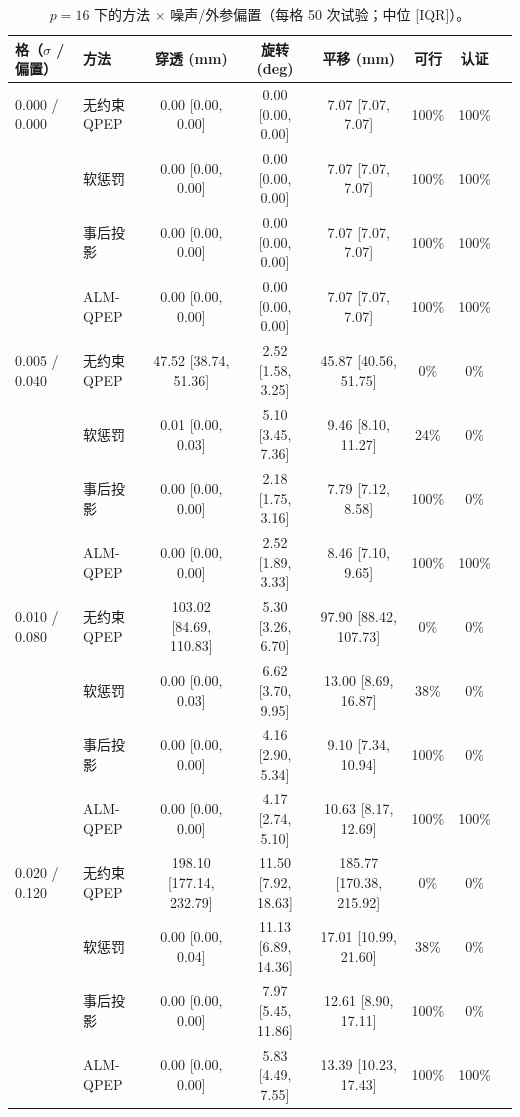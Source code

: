 \begin{table}[t]
\centering
\caption{$p=16$ 下的方法 $\times$ 噪声/外参偏置（每格 50 次试验；中位 [IQR]）。}
\label{tab:app_noise}
\scriptsize
\setlength{\tabcolsep}{3pt}
\begin{tabular}{@{}llcccccc@{}}
\toprule
格（$\sigma$ / 偏置） & 方法 & 穿透 (mm) & 旋转 (deg) & 平移 (mm) & 可行 & 认证 \\
\midrule
0.000 / 0.000 & 无约束 QPEP & 0.00 [0.00, 0.00] & 0.00 [0.00, 0.00] & 7.07 [7.07, 7.07] & 100\% & 100\% \\
 & 软惩罚 & 0.00 [0.00, 0.00] & 0.00 [0.00, 0.00] & 7.07 [7.07, 7.07] & 100\% & 100\% \\
 & 事后投影 & 0.00 [0.00, 0.00] & 0.00 [0.00, 0.00] & 7.07 [7.07, 7.07] & 100\% & 100\% \\
 & ALM-QPEP & 0.00 [0.00, 0.00] & 0.00 [0.00, 0.00] & 7.07 [7.07, 7.07] & 100\% & 100\% \\
\midrule
0.005 / 0.040 & 无约束 QPEP & 47.52 [38.74, 51.36] & 2.52 [1.58, 3.25] & 45.87 [40.56, 51.75] & 0\% & 0\% \\
 & 软惩罚 & 0.01 [0.00, 0.03] & 5.10 [3.45, 7.36] & 9.46 [8.10, 11.27] & 24\% & 0\% \\
 & 事后投影 & 0.00 [0.00, 0.00] & 2.18 [1.75, 3.16] & 7.79 [7.12, 8.58] & 100\% & 0\% \\
 & ALM-QPEP & 0.00 [0.00, 0.00] & 2.52 [1.89, 3.33] & 8.46 [7.10, 9.65] & 100\% & 100\% \\
\midrule
0.010 / 0.080 & 无约束 QPEP & 103.02 [84.69, 110.83] & 5.30 [3.26, 6.70] & 97.90 [88.42, 107.73] & 0\% & 0\% \\
 & 软惩罚 & 0.00 [0.00, 0.03] & 6.62 [3.70, 9.95] & 13.00 [8.69, 16.87] & 38\% & 0\% \\
 & 事后投影 & 0.00 [0.00, 0.00] & 4.16 [2.90, 5.34] & 9.10 [7.34, 10.94] & 100\% & 0\% \\
 & ALM-QPEP & 0.00 [0.00, 0.00] & 4.17 [2.74, 5.10] & 10.63 [8.17, 12.69] & 100\% & 100\% \\
\midrule
0.020 / 0.120 & 无约束 QPEP & 198.10 [177.14, 232.79] & 11.50 [7.92, 18.63] & 185.77 [170.38, 215.92] & 0\% & 0\% \\
 & 软惩罚 & 0.00 [0.00, 0.04] & 11.13 [6.89, 14.36] & 17.01 [10.99, 21.60] & 38\% & 0\% \\
 & 事后投影 & 0.00 [0.00, 0.00] & 7.97 [5.45, 11.86] & 12.61 [8.90, 17.11] & 100\% & 0\% \\
 & ALM-QPEP & 0.00 [0.00, 0.00] & 5.83 [4.49, 7.55] & 13.39 [10.23, 17.43] & 100\% & 100\% \\
\bottomrule
\end{tabular}

\end{table}


